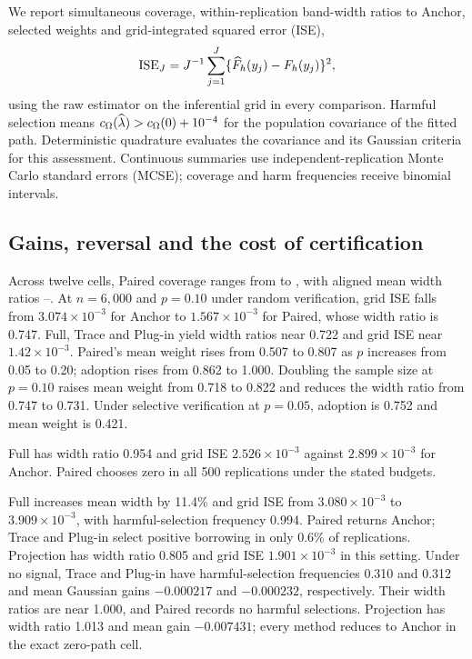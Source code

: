We report simultaneous coverage, within-replication band-width ratios to Anchor, selected weights and grid-integrated squared error (ISE),
\[
 \operatorname{ISE}_{J}=J^{-1}\sum_{j=1}^J
       \{\widehat F_h(y_j)-F_h(y_j)\}^2,
\]
using the raw estimator on the inferential grid in every comparison.
Harmful selection means $c_\Omega(\widehat\lambda)>c_\Omega(0)+10^{-4}$ for the population covariance of the fitted path.
Deterministic quadrature evaluates the covariance and its Gaussian criteria for this assessment.
Continuous summaries use independent-replication Monte Carlo standard errors (MCSE); coverage and harm frequencies receive binomial intervals.

\subsection{Gains, reversal and the cost of certification}
Across twelve cells, Paired coverage ranges from \SimCovMin{} to \SimCovMax{}, with aligned mean width ratios \SimAlignedWidthMin{}--\SimAlignedWidthMax{}.
At $n=6,000$ and $p=0.10$ under random verification, grid ISE falls from $3.074\times10^{-3}$ for Anchor to $1.567\times10^{-3}$ for Paired, whose width ratio is 0.747.
Full, Trace and Plug-in yield width ratios near 0.722 and grid ISE near $1.42\times10^{-3}$.
Paired's mean weight rises from 0.507 to 0.807 as $p$ increases from 0.05 to 0.20; adoption rises from 0.862 to 1.000.
Doubling the sample size at $p=0.10$ raises mean weight from 0.718 to 0.822 and reduces the width ratio from 0.747 to 0.731.
Under selective verification at $p=0.05$, adoption is 0.752 and mean weight is 0.421.

Full has width ratio 0.954 and grid ISE $2.526\times10^{-3}$ against $2.899\times10^{-3}$ for Anchor.
Paired chooses zero in all 500 replications under the stated budgets.

Full increases mean width by 11.4\% and grid ISE from $3.080\times10^{-3}$ to $3.909\times10^{-3}$, with harmful-selection frequency 0.994.
Paired returns Anchor; Trace and Plug-in select positive borrowing in only 0.6\% of replications.
Projection has width ratio 0.805 and grid ISE $1.901\times10^{-3}$ in this setting.
Under no signal, Trace and Plug-in have harmful-selection frequencies 0.310 and 0.312 and mean Gaussian gains $-0.000217$ and $-0.000232$, respectively.
Their width ratios are near 1.000, and Paired records no harmful selections.
Projection has width ratio 1.013 and mean gain $-0.007431$; every method reduces to Anchor in the exact zero-path cell.

